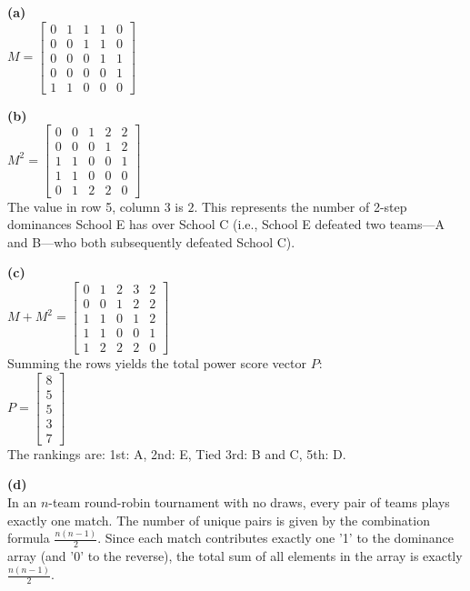 \begin{solution}
\textbf{(a)} \\
$M = \begin{bmatrix} 0 & 1 & 1 & 1 & 0 \\ 0 & 0 & 1 & 1 & 0 \\ 0 & 0 & 0 & 1 & 1 \\ 0 & 0 & 0 & 0 & 1 \\ 1 & 1 & 0 & 0 & 0 \end{bmatrix}$

\medskip
\textbf{(b)} \\
$M^2 = \begin{bmatrix} 0 & 0 & 1 & 2 & 2 \\ 0 & 0 & 0 & 1 & 2 \\ 1 & 1 & 0 & 0 & 1 \\ 1 & 1 & 0 & 0 & 0 \\ 0 & 1 & 2 & 2 & 0 \end{bmatrix}$ \\
The value in row 5, column 3 is $2$. This represents the number of 2-step dominances School E has over School C (i.e., School E defeated two teams—A and B—who both subsequently defeated School C).

\medskip
\textbf{(c)} \\
$M + M^2 = \begin{bmatrix} 0 & 1 & 2 & 3 & 2 \\ 0 & 0 & 1 & 2 & 2 \\ 1 & 1 & 0 & 1 & 2 \\ 1 & 1 & 0 & 0 & 1 \\ 1 & 2 & 2 & 2 & 0 \end{bmatrix}$ \\
Summing the rows yields the total power score vector $P$: \\
$P = \begin{bmatrix} 8 \\ 5 \\ 5 \\ 3 \\ 7 \end{bmatrix}$ \\
The rankings are: 1st: A, 2nd: E, Tied 3rd: B and C, 5th: D.

\medskip
\textbf{(d)} \\
In an $n$-team round-robin tournament with no draws, every pair of teams plays exactly one match. The number of unique pairs is given by the combination formula $\frac{n(n-1)}{2}$. Since each match contributes exactly one '1' to the dominance array (and '0' to the reverse), the total sum of all elements in the array is exactly $\frac{n(n-1)}{2}$.
\end{solution}

